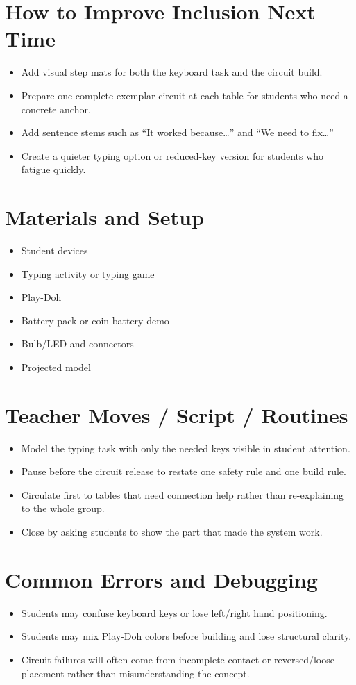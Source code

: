 \documentclass[11pt]{article}
\begin{document}
\section*{How to Improve Inclusion Next Time}
\begin{itemize}[leftmargin=*]
\item Add visual step mats for both the keyboard task and the circuit build.
\item Prepare one complete exemplar circuit at each table for students who need a concrete anchor.
\item Add sentence stems such as “It worked because…” and “We need to fix…”
\item Create a quieter typing option or reduced-key version for students who fatigue quickly.
\end{itemize}

\section*{Materials and Setup}
\begin{itemize}[leftmargin=*]
\item Student devices
\item Typing activity or typing game
\item Play-Doh
\item Battery pack or coin battery demo
\item Bulb/LED and connectors
\item Projected model
\end{itemize}

\section*{Teacher Moves / Script / Routines}
\begin{itemize}[leftmargin=*]
\item Model the typing task with only the needed keys visible in student attention.
\item Pause before the circuit release to restate one safety rule and one build rule.
\item Circulate first to tables that need connection help rather than re-explaining to the whole group.
\item Close by asking students to show the part that made the system work.
\end{itemize}

\section*{Common Errors and Debugging}
\begin{itemize}[leftmargin=*]
\item Students may confuse keyboard keys or lose left/right hand positioning.
\item Students may mix Play-Doh colors before building and lose structural clarity.
\item Circuit failures will often come from incomplete contact or reversed/loose placement rather than misunderstanding the concept.
\end{itemize}
\end{document}

